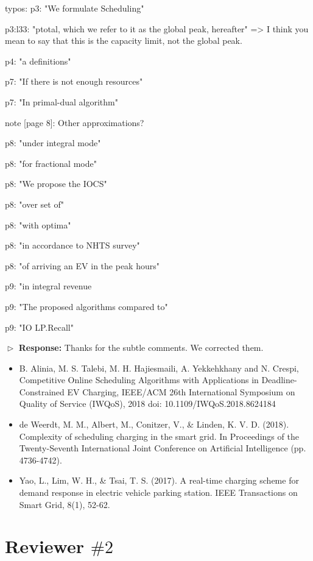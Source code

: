 \documentclass[11pt]{article}
\begin{document}
\vspace{3mm}
{\color{blue} typos:
p3: "We formulate Scheduling"

p3:l33: "ptotal, which we refer to it as the global peak, hereafter" => I think you mean to say that this is the capacity limit, not the global peak.

p4: "a definitions"

p7: "If there is not enough resources"

p7: "In primal-dual algorithm"

note [page 8]: Other approximations?

p8: "under integral mode"

p8: "for fractional mode"

p8: "We propose the IOCS"

p8: "over set of"

p8: "with optima"

p8: "in accordance to NHTS survey"

p8: "of arriving an EV in the peak hours"

p9: "in integral revenue

p9: "The proposed algorithms compared to"

p9: "IO LP.Recall"
 }
\vspace{3mm}

$\vartriangleright$ \noindent\textbf{Response:} 
Thanks for the subtle comments. We corrected them.


\begin{itemize}
\item B. Alinia, M. S. Talebi, M. H. Hajiesmaili, A. Yekkehkhany and N. Crespi, Competitive Online Scheduling Algorithms with Applications in Deadline-Constrained EV Charging, IEEE/ACM 26th International Symposium on Quality of Service (IWQoS), 2018
doi: 10.1109/IWQoS.2018.8624184

\item de Weerdt, M. M., Albert, M., Conitzer, V., \& Linden, K. V. D. (2018). Complexity of scheduling charging in the smart grid. In Proceedings of the Twenty-Seventh International Joint Conference on Artificial Intelligence (pp. 4736-4742).

\item Yao, L., Lim, W. H., \& Tsai, T. S. (2017). A real-time charging scheme for demand response in electric vehicle parking station. IEEE Transactions on Smart Grid, 8(1), 52-62.
\end{itemize}

\newpage
\section{Reviewer $\# 2$}
\end{document}

